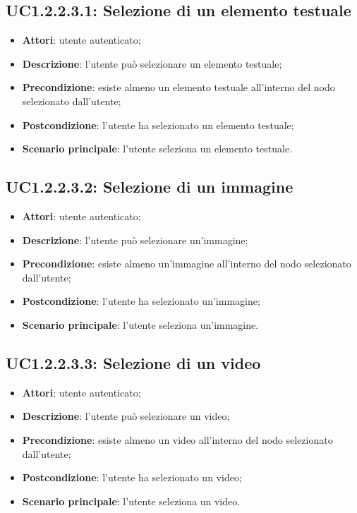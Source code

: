 \subsection{UC1.2.2.3.1: Selezione di un elemento testuale}
\label{UC1.2.2.3.1}
\begin{itemize}
\item \textbf{Attori}: utente autenticato;
\item \textbf{Descrizione}: l'utente può selezionare un elemento testuale;
\item \textbf{Precondizione}: esiste almeno un elemento testuale all'interno del nodo selezionato dall'utente;
\item \textbf{Postcondizione}: l'utente ha selezionato un elemento testuale;
\item \textbf{Scenario principale}:
l'utente seleziona un elemento testuale.
\end{itemize}
\subsection{UC1.2.2.3.2: Selezione di un immagine}
\label{UC1.2.2.3.2}
\begin{itemize}
\item \textbf{Attori}: utente autenticato;
\item \textbf{Descrizione}: l'utente può selezionare un'immagine;
\item \textbf{Precondizione}: esiste almeno un'immagine all'interno del nodo selezionato dall'utente;
\item \textbf{Postcondizione}: l'utente ha selezionato un'immagine;
\item \textbf{Scenario principale}:
l'utente seleziona un'immagine.
\end{itemize}
\subsection{UC1.2.2.3.3: Selezione di un video}
\label{UC1.2.2.3.3}
\begin{itemize}
\item \textbf{Attori}: utente autenticato;
\item \textbf{Descrizione}: l'utente può selezionare un video;
\item \textbf{Precondizione}: esiste almeno un video all'interno del nodo selezionato dall'utente;
\item \textbf{Postcondizione}: l'utente ha selezionato un video;
\item \textbf{Scenario principale}:
l'utente seleziona un video.
\end{itemize}
